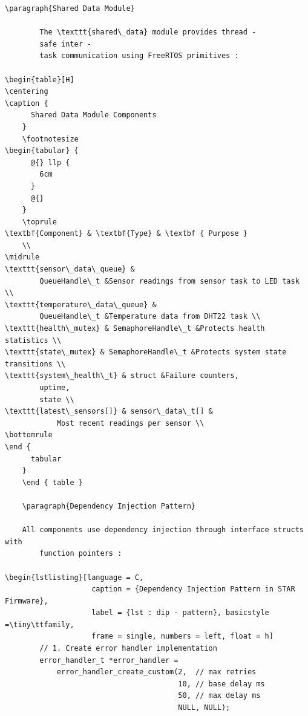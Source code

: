 \begin{lstlisting}[basicstyle =\tiny\ttfamily, frame = single,
                    caption = {ESP32 Firmware Repository Structure},
                    float = h]
    \paragraph{Shared Data Module}

        The \texttt{shared\_data} module provides thread -
        safe inter -
        task communication using FreeRTOS primitives :

\begin{table}[H]
\centering
\caption {
      Shared Data Module Components
    }
    \footnotesize
\begin{tabular} {
      @{} llp {
        6cm
      }
      @{}
    }
    \toprule
\textbf{Component} & \textbf{Type} & \textbf { Purpose }
    \\
\midrule
\texttt{sensor\_data\_queue} &
        QueueHandle\_t &Sensor readings from sensor task to LED task \\
\texttt{temperature\_data\_queue} &
        QueueHandle\_t &Temperature data from DHT22 task \\
\texttt{health\_mutex} & SemaphoreHandle\_t &Protects health statistics \\
\texttt{state\_mutex} & SemaphoreHandle\_t &Protects system state transitions \\
\texttt{system\_health\_t} & struct &Failure counters,
        uptime,
        state \\
\texttt{latest\_sensors[]} & sensor\_data\_t[] &
            Most recent readings per sensor \\
\bottomrule
\end {
      tabular
    }
    \end { table }

    \paragraph{Dependency Injection Pattern}

    All components use dependency injection through interface structs with
        function pointers :

\begin{lstlisting}[language = C,
                    caption = {Dependency Injection Pattern in STAR Firmware},
                    label = {lst : dip - pattern}, basicstyle =\tiny\ttfamily,
                    frame = single, numbers = left, float = h]
        // 1. Create error handler implementation
        error_handler_t *error_handler =
            error_handler_create_custom(2,  // max retries
                                        10, // base delay ms
                                        50, // max delay ms
                                        NULL, NULL);


\end{lstlisting}

